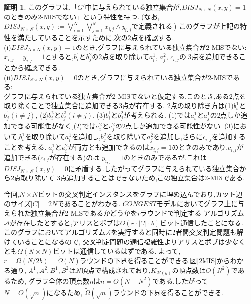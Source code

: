 \documentclass[12pt]{thesis}
\theoremstyle{definition}
\newtheorem*{prf*}{証明}
\begin{document}
\begin{prf*}
このグラフは,「$G'$中に与えられている独立集合が,$DISJ_{N \times N} (x, y) = 1$のときのみ2-MISでない」という特性を持つ. 
(なお,$DISJ_{N \times N} (x, y) :=\bigvee_{i = 1}^{N} \bigvee_{j = 1}^{N} x_{i, j} \land y_{i, j}$で定義される.)
このグラフが上記の特性を満たしていることを示すために,次の2点を確認する. \\
(i)$DISJ_{N \times N} (x, y) = 1$のとき,グラフに与えられている独立集合が2-MISでない: \\
$x_{i, j} = y_{i, j} =1$とすると,$b_{i}^{1}$と$b_{j}^{2}$の2点を取り除いて$a_{i}^{1}$, $a_{j}^{2}$, $c_{i, j}$の
3点を追加できることから確認できる. \\
(ii)$DISJ_{N \times N} (x, y) = 0$のとき,グラフに与えられている独立集合が2-MISである: \\ 
グラフに与えられている独立集合が2-MISでないと仮定する.このとき,ある2点を取り除くことで独立集合に追加できる3点が存在する.
2点の取り除き方は(1)$b_{i}^{1}$と$b_{j}^{1}(i \neq j)$, (2)$b_{i}^{2}$と$b_{j}^{2}(i \neq j)$, (3)$b_{i}^{1}$と$b_{j}^{2}$が考えられる.
(1)では$a_{i}^{1}$と$a_{j}^{1}$の2点しか追加できる可能性がなく,(2)では$a_{i}^{2}$と$a_{j}^{2}$の2点しか追加できる可能性がない.
(3)において,$b_{i}^{1}$を取り除いて$a_{i}^{1}$を追加し,$b_{j}^{2}$を取り除いて$a_{j}^{2}$を追加し,さらに$c_{i, j}$を追加することを考える.
$a_{i}^{1}$と$a_{i}^{2}$が両方とも追加できるのは$x_{i, j} = 1$のときのみであり,$c_{i, j}$が追加できる($c_{i, j}$が存在する)のは
$y_{i, j} = 1$のときのみであるが,これは$DISJ_{N \times N} (x, y) = 0$に矛盾する.したがってグラフに与えられている独立集合から2点取り除いて
3点追加することはできないため,この独立集合は2-MISである.

今回,$N \times N$ビットの交叉判定インスタンスをグラフに埋め込んでおり,カット辺のサイズ$|C| = 2N$であることがわかる.
$CONGEST$モデルにおいてグラフ上に与えられた独立集合が2-MISであるかどうかを$r$ラウンドで判定する
アルゴリズム$\mathcal{A}$が存在したとすると,アリスとボブは$O(r \cdot |C| \cdot b)$ビット通信したことになる.
このグラフにおいてアルゴリズム$\mathcal{A}$を実行すると同時に2者間交叉判定問題も解けていることになるので,
交叉判定問題の通信複雑性よりアリスとボブは少なくとも$\Omega (N \times N)$ビットは通信しているはずである.
よって,$r = \Omega (N / 2b) = \tilde{\Omega}(N)$ラウンドの下界を得ることができる.図\ref{2MIS}からわかる通り,
$A^{1}, A^{2}, B^{1}, B^{2}$は$N$頂点で構成されており,$K_{W(y)}$の頂点数は$O(N^{2})$であるため,
グラフ全体の頂点数$n$は$n = O(N + N^{2})$である.したがって$N = O(\sqrt{n})$になるため,
$\tilde{\Omega}(\sqrt{n})$ラウンドの下界を得ることができる. 
\end{prf*}
\newpage
\end{document}
